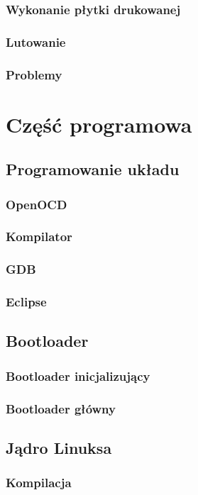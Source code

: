 \documentclass[a4paper]{article}
\begin{document}
			\subsubsection{Wykonanie płytki drukowanej}
			\subsubsection{Lutowanie}
			\subsubsection{Problemy}

	\section{Część programowa}
		\subsection{Programowanie układu}
			\subsubsection{OpenOCD}
			\subsubsection{Kompilator}
			\subsubsection{GDB}
			\subsubsection{Eclipse}
		\subsection{Bootloader}
			\subsubsection{Bootloader inicjalizujący}
			\subsubsection{Bootloader główny}
		\subsection{Jądro Linuksa}
			\subsubsection{Kompilacja}
\end{document}
